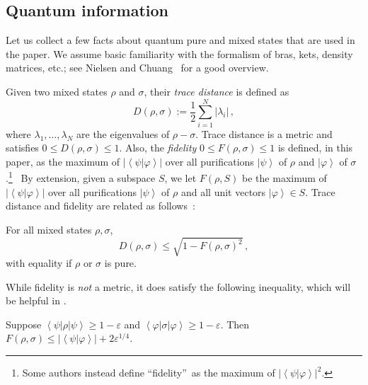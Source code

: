 \subsection{Quantum information\label{QI}}

Let us collect a few facts about quantum pure and mixed states that are used
in the paper. We assume basic familiarity with the formalism of bras, kets,
density matrices, etc.; see Nielsen and Chuang~\cite{nc} for a good overview.

Given two mixed states $\rho$ and $\sigma$, their \emph{trace distance} is
defined as 
\[
D\left(  \rho,\sigma\right)  :=\frac{1}{2}\sum_{i=1}^{N}\left\vert
\lambda_{i}\right\vert\,,
\]
where $\lambda_{1},\ldots,\lambda_{N}$ are the
eigenvalues of $\rho-\sigma$. Trace distance is a metric and satisfies
$0\leq D\left(  \rho,\sigma\right)  \leq1$. Also, the \emph{fidelity}
$0\leq F\left(  \rho,\sigma\right)  \leq1$ is defined, in this paper, as the
maximum of $\left\vert \left\langle \psi|\varphi\right\rangle \right\vert
$ over all purifications $\left\vert \psi\right\rangle $ of $\rho$ and
$\left\vert \varphi\right\rangle $ of $\sigma$.\footnote{Some authors instead
define \textquotedblleft fidelity\textquotedblright\ as the maximum of
$\left\vert \left\langle \psi|\varphi\right\rangle \right\vert ^{2}$.} \ By
extension, given a subspace $S$, we let $F\left(  \rho,S\right)  $ be the
maximum of $\left\vert \left\langle \psi|\varphi\right\rangle \right\vert
$ over all purifications $\left\vert \psi\right\rangle $ of $\rho$ and all
unit vectors $\left\vert \varphi\right\rangle \in S$. Trace distance and
fidelity are related as follows~\cite{nc}:

\begin{proposition}
\label{ineq}For all mixed states $\rho,\sigma$,%
\[
D\left(  \rho,\sigma\right)  \leq\sqrt{1-F\left(  \rho,\sigma\right)  ^{2}}\,,
\]
with equality if $\rho$ or $\sigma$ is pure.
\end{proposition}

While fidelity is \emph{not} a metric, it does satisfy the following
inequality, which will be helpful in .

\begin{lemma}
%
\label{triangle}Suppose $\left\langle \psi\right\vert \rho\left\vert
\psi\right\rangle \geq1-\varepsilon$ and $\left\langle \varphi\right\vert
\sigma\left\vert \varphi\right\rangle \geq1-\varepsilon$. Then $F\left(
\rho,\sigma\right)  \leq\left\vert \left\langle \psi|\varphi\right\rangle
\right\vert +2\varepsilon^{1/4}$.
\end{lemma}

